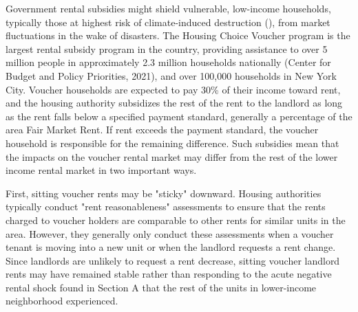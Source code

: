 \documentclass[12pt]{article}
\begin{document}
{{{{{Government rental subsidies might shield vulnerable, low-income households, typically those at highest risk of climate-induced destruction (\cite{van_zandt_mapping_2012}), from market fluctuations in the wake of disasters.  The Housing Choice Voucher program is the largest rental subsidy program in the country, providing assistance to over 5 million people in approximately 2.3 million households nationally (Center for Budget and Policy Priorities, 2021), and over 100,000 households in New York City.
Voucher households are expected to pay 30\% of their income toward rent, and the housing authority subsidizes the rest of the rent to the landlord as long as the rent falls below a specified payment standard, generally a percentage of the area Fair Market Rent. If rent exceeds the payment standard, the voucher household is responsible for the remaining difference. 
Such subsidies mean that the impacts on the voucher rental market may differ from the rest of the lower income rental market in two important ways.

First, sitting voucher rents may be "sticky" downward. Housing authorities typically conduct "rent reasonableness" assessments to ensure that the rents charged to voucher holders are comparable to other rents for similar units in the area. However, they generally only conduct these assessments when a voucher tenant is moving into a new unit or when the landlord requests a rent change.  Since landlords are unlikely to request a rent decrease, sitting voucher landlord rents may have remained stable rather than responding to the acute negative rental shock found in Section A that the rest of the units in lower-income neighborhood experienced.


}}}}}
\end{document}

